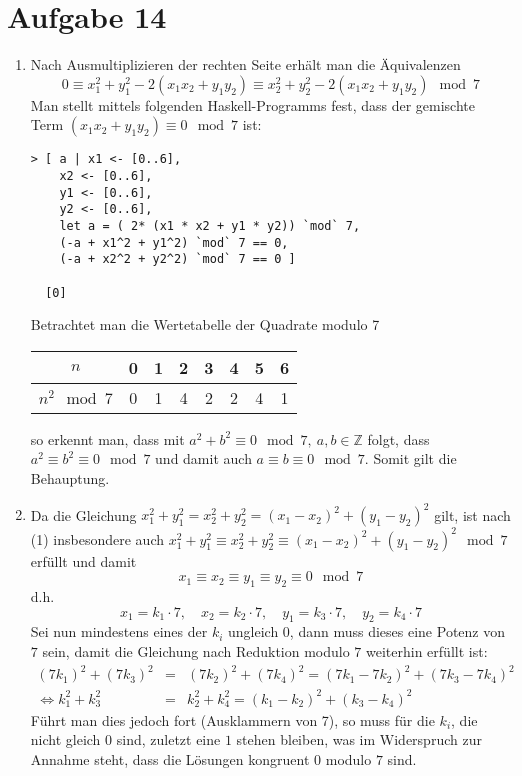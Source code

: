 \section*{Aufgabe 14}
\begin{enumerate}[(1)]
	\item
		Nach Ausmultiplizieren der rechten Seite erhält man die Äquivalenzen
		\[ 0 \equiv x_1^2 + y_1^2 - 2(x_1x_2 + y_1y_2) \equiv x_2^2 + y_2^2 - 2(x_1x_2 + y_1y_2)\mod 7 \]
		Man stellt mittels folgenden Haskell-Programms fest, dass der
		gemischte Term $(x_1x_2 + y_1y_2) \equiv 0\mod 7$ ist:
		\begin{lstlisting}
> [ a | x1 <- [0..6], 
	x2 <- [0..6],
	y1 <- [0..6],
	y2 <- [0..6],
	let a = ( 2* (x1 * x2 + y1 * y2)) `mod` 7,
	(-a + x1^2 + y1^2) `mod` 7 == 0,
	(-a + x2^2 + y2^2) `mod` 7 == 0 ]
	
  [0]
		\end{lstlisting}
		Betrachtet man die Wertetabelle der Quadrate modulo 7

		\begin{tabular}{c|ccccccc}
			$n$&0&1&2&3&4&5&6\\
			\hline
			$n^2\mod 7$&0&1&4&2&2&4&1
		\end{tabular}

		so erkennt man, dass mit $a^2 + b^2 \equiv 0\mod7,\ a,b \in
		\mathbb{Z}$ folgt, dass $a^2 \equiv b^2 \equiv 0\mod 7$ und
		damit auch $a \equiv b \equiv 0\mod7$. Somit gilt die
		Behauptung.
	\item
		Da die Gleichung
		$x_1^2+y_1^2=x_2^2+y_2^2=(x_1-x_2)^2+(y_1-y_2)^2$ gilt, ist
		nach (1) insbesondere auch $x_1^2+y_1^2\equiv x_2^2+y_2^2\equiv
		(x_1-x_2)^2+(y_1-y_2)^2\mod 7$ erfüllt und damit
		\[ x_1 \equiv x_2 \equiv y_1 \equiv y_2 \equiv 0\mod 7 \]
		d.h.
		\[ x_1 = k_1 \cdot 7,\quad x_2 = k_2 \cdot 7,\quad y_1 = k_3 \cdot 7,\quad y_2 = k_4 \cdot 7 \]
		Sei nun mindestens eines der $k_i$ ungleich $0$, dann muss
		dieses eine Potenz von $7$ sein, damit die Gleichung nach
		Reduktion modulo $7$ weiterhin erfüllt ist:
		\begin{eqnarray*}
			(7 k_1)^2+(7 k_3)^2&=&(7 k_2)^2+(7 k_4)^2=(7 k_1 - 7 k_2)^2 + (7 k_3 - 7 k_4)^2 \\
			\Leftrightarrow k_1^2+k_3^2&=&k_2^2+k_4^2=(k_1 - k_2)^2 + (k_3 - k_4)^2
		\end{eqnarray*}
		Führt man dies jedoch fort (Ausklammern von 7), so muss für die
		$k_i$, die nicht gleich $0$ sind, zuletzt eine $1$ stehen
		bleiben, was im Widerspruch zur Annahme steht, dass die
		Lösungen kongruent $0$ modulo $7$ sind.


\end{enumerate}
